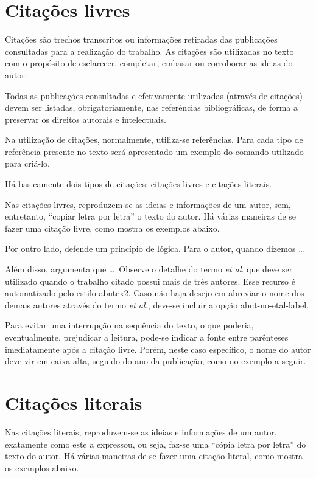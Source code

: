 \section{Citações livres}\label{citacoesLivres}
Citações são trechos transcritos ou informações retiradas das publicações consultadas para a realização do trabalho.
As citações são utilizadas no texto com o propósito de esclarecer, completar, embasar ou corroborar as ideias do autor.

Todas as publicações consultadas e efetivamente utilizadas (através de citações) devem ser listadas, obrigatoriamente, nas referências bibliográficas, de forma a preservar os direitos autorais e intelectuais.

Na utilização de citações, normalmente, utiliza-se referências.
Para cada tipo de referência presente no texto será apresentado um exemplo do comando utilizado para criá-lo.

Há basicamente dois tipos de citações: citações livres e citações literais.

Nas citações livres, reproduzem-se as ideias e informações de um autor, sem, entretanto, ``copiar letra por letra'' o texto do autor.
Há várias maneiras de se fazer uma citação livre, como mostra os exemplos abaixo.

Por outro lado,  defende um princípio de lógica.
Para o autor, quando dizemos \ldots

Além disso,  argumenta que \ldots\mbox{ }Observe o detalhe do termo \textit{et al}.
que deve ser utilizado quando o trabalho citado possui mais de três autores.
Esse recurso é automatizado pelo estilo {\ttfamily abntex2}.
Caso não haja desejo em abreviar o nome dos demais autores através do termo \textit{et al.}, deve-se incluir a opção {\ttfamily abnt-no-etal-label}.

Para evitar uma interrupção na sequência do texto, o que poderia, eventualmente, prejudicar a leitura, pode-se indicar a fonte entre parênteses imediatamente após a citação livre.
Porém, neste caso específico, o nome do autor deve vir em caixa alta, seguido do ano da publicação, como no exemplo a seguir.



\section{Citações literais}\label{citacoesLiterais}
Nas citações literais, reproduzem-se as ideias e informações de um autor, exatamente como este a expressou, ou seja, faz-se uma ``cópia letra por letra'' do texto do autor.
Há várias maneiras de se fazer uma citação literal, como mostra os exemplos abaixo.

